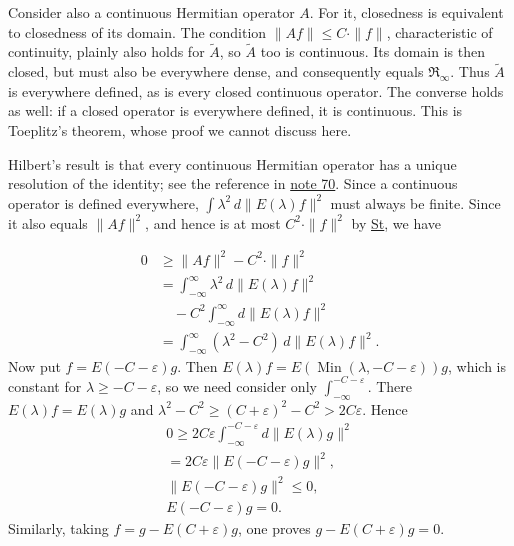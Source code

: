 \documentclass[fontsize=13pt,twoside,openany,headings=normal,parskip=false,bookmarkpackage=false,DIV=calc]{scrbook}
\begin{document}
Consider also a continuous Hermitian operator $A$. For it, closedness is equivalent to closedness of its domain. The condition $\|Af\|\leq C\cdot\|f\|$, characteristic of continuity, plainly also holds for $\widetilde A$, so $\widetilde A$ too is continuous. Its domain is then closed, but must also be everywhere dense, and consequently equals $\mathfrak{R}_\infty$. Thus $\widetilde A$ is everywhere defined, as is every closed continuous operator. The converse holds as well: if a closed operator is everywhere defined, it is continuous. This is Toeplitz's theorem, whose proof we cannot discuss here.

Hilbert's result is that every continuous Hermitian operator has a unique resolution of the identity; see the reference in \hyperlink{note-70}{note 70}. Since a continuous operator is defined everywhere, $\int\lambda^2\,d\|E(\lambda)f\|^2$ must always be finite. Since it also equals $\|Af\|^2$, and hence is at most $C^2\cdot\|f\|^2$ by \hyperref[eq:II.9.St]{St}, we have

\hypertarget{origpage-78}{}%
\begin{align*}
0&\geq\|Af\|^2-C^2\cdot\|f\|^2\\
&=\int_{-\infty}^{\infty}\lambda^2\,d\|E(\lambda)f\|^2\\
&\quad-C^2\int_{-\infty}^{\infty}d\|E(\lambda)f\|^2\\
&=\int_{-\infty}^{\infty}(\lambda^2-C^2)\,d\|E(\lambda)f\|^2.
\end{align*}
Now put $f=E(-C-\varepsilon)g$. Then $E(\lambda)f=E(\operatorname{Min}(\lambda,-C-\varepsilon))g$, which is constant for $\lambda\geq-C-\varepsilon$, so we need consider only $\int_{-\infty}^{-C-\varepsilon}$. There $E(\lambda)f=E(\lambda)g$ and $\lambda^2-C^2\geq(C+\varepsilon)^2-C^2>2C\varepsilon$. Hence
\begin{gather*}
0\geq2C\varepsilon\int_{-\infty}^{-C-\varepsilon}d\|E(\lambda)g\|^2\\
=2C\varepsilon\|E(-C-\varepsilon)g\|^2,\\
\|E(-C-\varepsilon)g\|^2\leq0,\\ E(-C-\varepsilon)g=0.
\end{gather*}
Similarly, taking $f=g-E(C+\varepsilon)g$, one proves $g-E(C+\varepsilon)g=0$.
\end{document}
